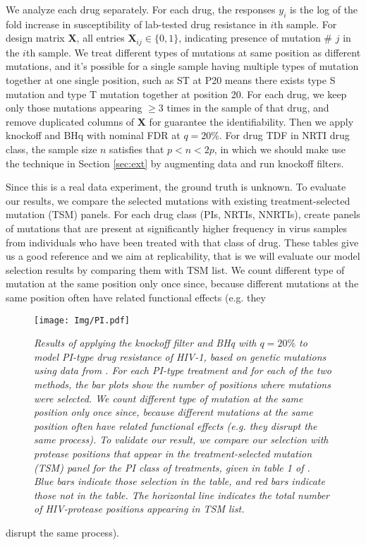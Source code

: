 \documentclass{uwstat572}
\begin{document}
We analyze each drug separately. For each drug, the responses $y_i$ is the log of the fold increase in susceptibility of lab-tested drug resistance in $i$th sample. For design matrix $\bm{X}$, all entries $\bm{X}_{ij} \in \{0,1\}$, indicating presence of mutation \# $j$ in the $i$th sample. We treat different types of mutations at same position as different mutations, and it's possible for a single sample having multiple types of mutation together at one single position, such as ST at P20 means there exists type S mutation and type T mutation together at position 20. For each drug, we keep only those mutations appearing $\geq 3$ times in the sample of that drug, and remove duplicated columns of $\bm{X}$ for guarantee the identifiability. Then we apply knockoff and BHq with nominal FDR at $q=20\%$. For drug TDF in NRTI drug class, the sample size $n$ satisfies that $p < n<2p$, in which we should make use the technique in Section \ref{sec:ext} by augmenting data and run knockoff filters.

Since this is a real data experiment, the ground truth is unknown. To evaluate our results, we compare the selected mutations with existing treatment-selected mutation (TSM) panels. For each drug class (PIs, NRTIs, NNRTIs), \cite{rhee2005hiv} create panels of mutations that are present at significantly higher frequency in virus samples from individuals who have been treated with that class of drug. These tables give us a good reference and we aim at replicability, that is we will evaluate our model selection results by comparing them with TSM list. We count different type of mutation at the same position only once since, because different mutations at the same position often have related functional effects (e.g. they 

\begin{figure}[!htb]\label{Fig:6}
	\centering\texttt{[image: Img/PI.pdf]}
	\caption{{\it Results of applying the knockoff filter and BHq with $q=20\%$ to model PI-type drug resistance of HIV-1, based on genetic mutations using data from \cite{rhee2006genotypic}. For each PI-type treatment and for each of the two methods, the bar plots show the number of positions where mutations were selected. We count different type of mutation at the same position only once since, because different mutations at the same position often have related functional effects (e.g. they disrupt the same process). To validate our result, we compare our selection with protease positions that appear in the treatment-selected mutation (TSM) panel for the PI class of treatments, given in table 1 of \cite{rhee2005hiv}. Blue bars indicate those selection in the table, and red bars indicate those not in the table. The horizontal line indicates the total number of HIV-protease positions appearing in TSM list.}}
\end{figure} 
disrupt the same process).
\end{document}
